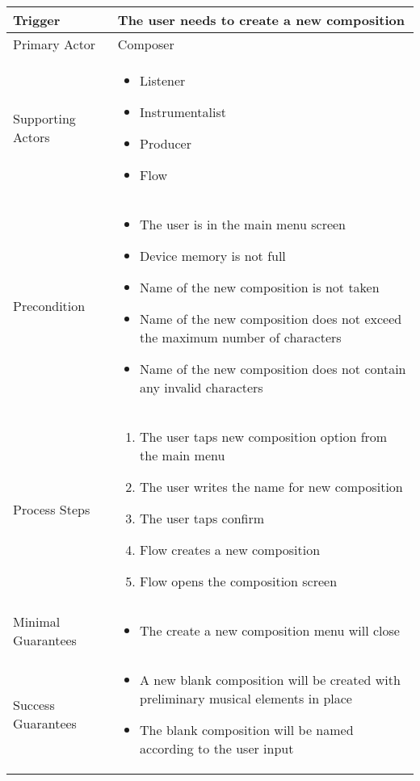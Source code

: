 \begin{longtable}{|X|X|}

\hline
Trigger & 
The user needs to create a new composition \\
\hline
Primary Actor & 
Composer \\
\hline
Supporting Actors & 
\begin{itemize}
\item Listener
\item Instrumentalist
\item Producer
\item Flow
\end{itemize} \\
\hline
Precondition & 
\begin{itemize}
\item The user is in the main menu screen
\item Device memory is not full
\item Name of the new composition is not taken
\item Name of the new composition does not exceed the maximum number of characters
\item Name of the new composition does not contain any invalid characters
\end{itemize} \\
\hline
Process Steps & 
\begin{enumerate}
\item The user taps new composition option from the main menu
\item The user writes the name for new composition
\item The user taps confirm
\item Flow creates a new composition
\item Flow opens the composition screen
\end{enumerate} \\
\hline
Minimal Guarantees & 
\begin{itemize}
	\item The create a new composition menu will close
\end{itemize} \\
\hline
Success Guarantees & 
\begin{itemize}
	\item A new blank composition will be created with preliminary musical elements in place
	\item The blank composition will be named according to the user input
\end{itemize} \\
\hline
\end{longtable}